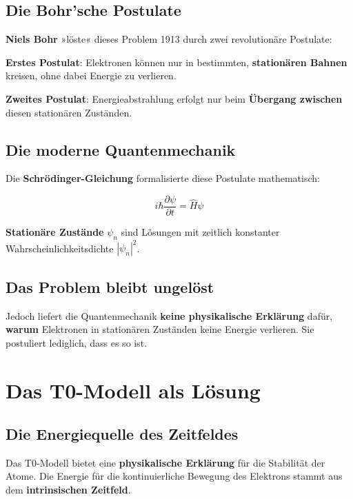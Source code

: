 \documentclass[12pt,a4paper]{report}
\begin{document}
	\subsection{Die Bohr'sche Postulate}
	
	\textbf{Niels Bohr} »löste« dieses Problem 1913 durch zwei revolutionäre Postulate:
	
	\textbf{Erstes Postulat}: Elektronen können nur in bestimmten, \textbf{stationären Bahnen} kreisen, ohne dabei Energie zu verlieren.
	
	\textbf{Zweites Postulat}: Energieabstrahlung erfolgt nur beim \textbf{Übergang zwischen} diesen stationären Zuständen.
	
	\subsection{Die moderne Quantenmechanik}
	
	Die \textbf{Schrödinger-Gleichung} formalisierte diese Postulate mathematisch:
	
	\begin{equation}
		i\hbar\frac{\partial\psi}{\partial t} = \hat{H}\psi
	\end{equation}
	
	\textbf{Stationäre Zustände} $\psi_n$ sind Lösungen mit zeitlich konstanter Wahrscheinlichkeitsdichte $|\psi_n|^2$.
	
	\subsection{Das Problem bleibt ungelöst}
	
	Jedoch liefert die Quantenmechanik \textbf{keine physikalische Erklärung} dafür, \textbf{warum} Elektronen in stationären Zuständen keine Energie verlieren. Sie postuliert lediglich, dass es so ist.
	
	\section{Das T0-Modell als Lösung}
	
	\subsection{Die Energiequelle des Zeitfeldes}
	
	Das T0-Modell bietet eine \textbf{physikalische Erklärung} für die Stabilität der Atome. Die Energie für die kontinuierliche Bewegung des Elektrons stammt aus dem \textbf{intrinsischen Zeitfeld}.
	
\end{document}
